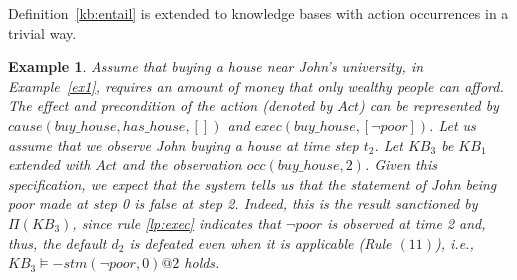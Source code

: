 \documentclass{article}
\newtheorem{example}{Example}%
\begin{document}
%

% 
%
Definition~\ref{kb:entail} 
 is extended to knowledge bases with action occurrences in a trivial way.  

\begin{example}\label{ex3} 
Assume that buying a house near John's university, in Example~\ref{ex1},
 requires an  amount of money that only wealthy people can afford. The effect and precondition of the action (denoted by $Act$) 
 can be represented by  
$cause(buy\_house, has\_house, [])$ and $exec(buy\_house, [\neg poor])$. 
Let us assume that we observe  John buying a house at time step $t_2$. 
Let $KB_3$ be $KB_1$ extended with $Act$ and the observation $occ(buy\_house,2)$. 
Given this specification, we  expect that the system tells us that the statement of John being poor made at step 0 is false at step 2. Indeed, 
this is the result sanctioned by $\Pi(KB_3)$, since rule \eqref{lp:exec} 
indicates that $\neg poor$ is observed at time 2 and, thus,  the default $d_2$ is defeated even when it is applicable (Rule $(11)$), i.e., $KB_3 \models {-}stm(\neg poor, 0)@2$ holds.
\end{example}  
 
\end{document}
